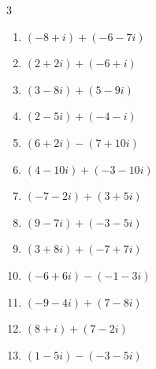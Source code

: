 \begin{multicols}{3}
\begin{enumerate}
  \item $\displaystyle (-8+i) + (-6-7i)$

        \phantom{$\displaystyle =-14-6i$}

  \item $\displaystyle (2+2i) + (-6+i)$

        \phantom{$\displaystyle =-4+3i$}

  \item $\displaystyle (3-8i) + (5-9i)$

        \phantom{$\displaystyle =8-17i$}

  \item $\displaystyle (2-5i) + (-4-i)$

        \phantom{$\displaystyle =-2-6i$}

  \item $\displaystyle (6+2i) - (7+10i)$

        \phantom{$\displaystyle =-1-8i$}

  \item $\displaystyle (4-10i) + (-3-10i)$

        \phantom{$\displaystyle =1-20i$}

  \item $\displaystyle (-7-2i) + (3+5i)$

        \phantom{$\displaystyle =-4+3i$}

  \item $\displaystyle (9-7i) + (-3-5i)$

        \phantom{$\displaystyle =6-12i$}

  \item $\displaystyle (3+8i) + (-7+7i)$

        \phantom{$\displaystyle =-4+15i$}

  \item $\displaystyle (-6+6i) - (-1-3i)$

        \phantom{$\displaystyle =-5+9i$}

  \item $\displaystyle (-9-4i) + (7-8i)$

        \phantom{$\displaystyle =-2-12i$}

  \item $\displaystyle (8+i) + (7-2i)$

        \phantom{$\displaystyle =15-i$}

  \item $\displaystyle (1-5i) - (-3-5i)$

        \phantom{$\displaystyle =4$}


\end{enumerate}
\end{multicols}
